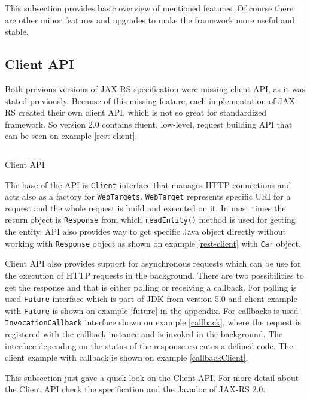 \documentclass[12pt,final,oneside]{fithesis2}
\begin{document}
This subsection provides basic overview of mentioned features. Of course there are other minor features and upgrades to make the framework more useful and stable.

\subsection*{Client API}\label{client-api}
Both previous versions of JAX-RS specification were missing client API, as it was stated previously. Because of this missing feature, each implementation of JAX-RS created their own client API, which is not so great for standardized framework. So version 2.0 contains fluent, low-level, request building API that can be seen on example \ref{rest-client}. 

\begin{listing}[ht]
	\inputminted[]{java}{sources/client.java}
	\caption{Client API}
	\label{rest-client}
\end{listing}

The base of the API is \texttt{Client} interface that manages HTTP connections and acts also as a factory for \texttt{WebTargets}. \texttt{WebTarget} represents specific URI for a request and the whole request is build and executed on it. In most times the return object is \texttt{Response} from which \texttt{readEntity()} method is used for getting the entity. API also provides way to get specific Java object directly without working with \texttt{Response} object as shown on example \ref{rest-client} with \texttt{Car} object.

Client API also provides support for asynchronous requests which can be use for the execution of HTTP requests in the background. There are two possibilities to get the response and that is either polling or receiving a callback. For polling is used \texttt{Future} interface which is part of JDK from version 5.0 and client example with \texttt{Future} is shown on example \ref{future} in the appendix. For callbacks is used \texttt{InvocationCallback} interface shown on example \ref{callback}, where the request is registered with the callback instance and is invoked in the background. The interface depending on the status of the response executes a defined code\cite{jax-rs-2.0-new}\cite{jax-rs-2.0}. The client example with callback is shown on example \ref{callbackClient}.

This subsection just gave a quick look on the Client API. For more detail about the Client API check the specification and the Javadoc of JAX-RS 2.0.
\end{document}
